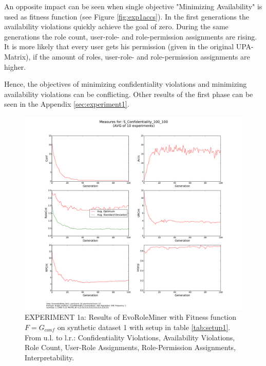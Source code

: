 An opposite impact can be seen when single objective "Minimizing Availability" is used as fitness function (see Figure \ref{fig:exp1accs}). In the first generations the availability violations quickly achieve the goal of zero. During the same generations the role count, user-role- and role-permission assignments are rising. It is more likely that every user gets his permission (given in the original UPA-Matrix), if the amount of roles, user-role- and role-permission assignments are higher.

Hence, the objectives of minimizing confidentiality violations and minimizing availability violations can be conflicting. Other results of the first phase can be seen in the Appendix \ref{sec:experiment1}.

\begin{figure}[H]
    \centering
    \includegraphics[scale=0.33, trim=4cm 2cm 4cm 0cm, clip=true]{./Figures/exp1conf}
    \caption{EXPERIMENT 1a: Results of EvoRoleMiner with Fitness function $F=G_{conf}$ on synthetic dataset 1 with setup in table \ref{tab:setup1}. From u.l. to l.r.: Confidentiality Violations, Availability Violations, Role Count, User-Role Assignments, Role-Permission Assignments, Interpretability.}
    \label{fig:exp1conf}
\end{figure}

